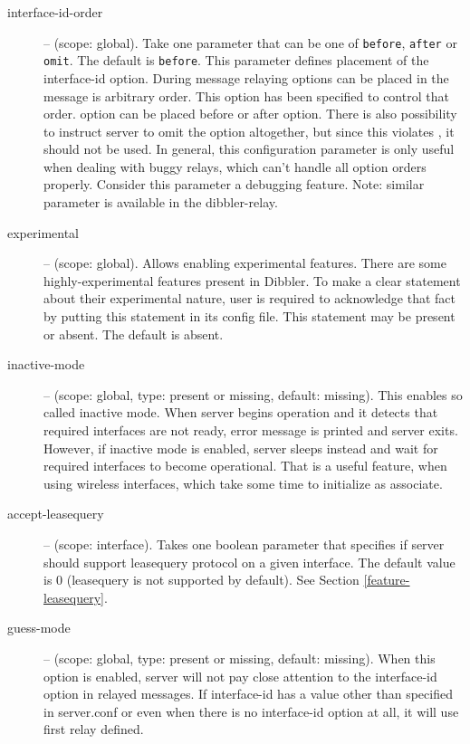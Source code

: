 \begin{description}
\item[interface-id-order] -- (scope: global). Take one parameter that
  can be one of \verb+before+, \verb+after+ or \verb+omit+. The
        default is \verb+before+. This parameter defines placement of
        the interface-id option. During message relaying options can
        be placed in the  message is arbitrary
        order. This option has been specified to control that
        order.  option can be placed before or
        after  option. There is also possibility to
        instruct server to omit the  option
        altogether, but since this violates \cite{rfc3315}, it should
        not be used. In general, this configuration parameter is only
        useful when dealing with buggy relays, which can't handle all
        option orders properly. Consider this parameter a debugging
        feature. Note: similar parameter is available in the
        dibbler-relay.

\item[experimental] -- (scope: global). Allows enabling experimental
features. There are some highly-experimental features present in
Dibbler. To make a clear statement about their experimental nature,
user is required to acknowledge that fact by putting this statement in
its config file. This statement may be present or absent. The default
is absent.

\item[inactive-mode] -- (scope: global, type: present or missing,
  default: missing). This enables so called inactive mode. When server
  begins operation and it detects that required interfaces are not
  ready, error message is printed and server exits. However, if
  inactive mode is enabled, server sleeps instead and wait for
  required interfaces to become operational. That is a useful feature,
  when using wireless interfaces, which take some time to initialize
  as associate.

\item[accept-leasequery] -- (scope: interface). Takes one boolean
  parameter that specifies if server should support leasequery
  \cite{rfc5007} protocol on a given interface. The default value is
  0 (leasequery is not supported by default). See Section
  \ref{feature-leasequery}.


\item[guess-mode] -- (scope: global, type: present or missing,
  default: missing). When this option is enabled, server will not pay
  close attention to the interface-id option in relayed messages. If
  interface-id has a value other than specified in server.conf or even
  when there is no interface-id option at all, it will use first relay
  defined.


\end{description}
